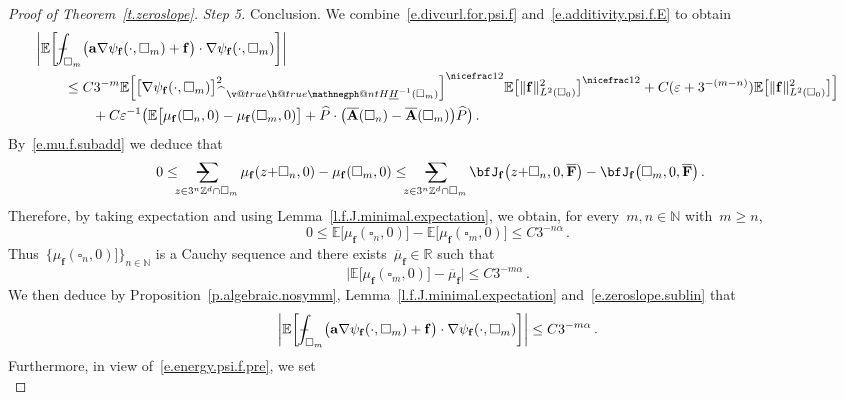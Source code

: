 \documentclass[11pt,twoside]{article} %
\makeatletter
\let\oldsquare\square %
\renewcommand{\square}{\oldsquare}
\numberwithin{equation}{section}
\theoremstyle{definition}
\newcommand*{\N}{\ensuremath{\mathbb{N}}}
\newcommand*{\Z}{\ensuremath{\mathbb{Z}}}
\newcommand*{\R}{\ensuremath{\mathbb{R}}}
\newcommand{\eps}{\varepsilon}
\renewcommand*{\hat}{\widehat}
\newcommand{\f}{\mathbf{f}}
\newcommand{\ep}{\eps}
\renewcommand{\a}{\mathbf{a}}
\newcommand{\cu}{\square}
\newcommand{\E}{\mathbb{E}}
\newcommand{\avsum}{\mathop{\mathpalette\avsuminner\relax}\displaylimits}
\newcommand\avsuminner[2]{%
  {\sbox0{$\m@th#1\sum$}%
   \vphantom{\usebox0}%
   \ooalign{%
     \hidewidth
     \smash{\,\rule[.23em]{8.8pt}{1.1pt} \relax}%
     \hidewidth\cr
   ~$\m@th#1\sum$\cr
   }%
  }%
}
\def\Xint#1{\mathchoice
{\XXint\displaystyle\textstyle{#1}}%
{\XXint\textstyle\scriptstyle{#1}}%
{\XXint\scriptstyle\scriptscriptstyle{#1}}%
{\XXint\scriptscriptstyle\scriptscriptstyle{#1}}%
\!\int}
\def\XXint#1#2#3{{\setbox0=\hbox{$#1{#2#3}{\int}$}
\vcenter{\hbox{$#2#3$}}\kern-.5\wd0}}
\def\fint{\Xint-}
\newcommand{\negphantom}{\v@true\h@true\negph@nt}
\newcommand{\negph@nt}{\ifmmode\expandafter\mathpalette 
  \expandafter\mathnegph@nt\else\expandafter\makenegph@nt\fi}
\newcommand{\makenegph@nt}[1]{%
  \setbox\z@\hbox{\color@begingroup#1\color@endgroup}\finnegph@nt}
\newcommand{\finnegph@nt}{%
  \setbox\tw@\null 
  \ifv@ \ht\tw@\ht\z@\dp\tw@\dp\z@\fi \ifh@\wd\tw@-\wd\z@\fi\box\tw@}
\newcommand{\mathnegph@nt}[2]{%
  \setbox\z@\hbox{$\m@th #1{#2}$}\finnegph@nt}
\newcommand{\Hminusul}{\hat{\phantom{H}}\negphantom{H}\underline{H}^{-1}}
\newcommand{\bfAhom}{\overline{\mathbf{A}}}
\newcommand{\bfF}{\mathbf{F}}
\makeatother
\begin{document}
\begin{proof}[{Proof of Theorem~\ref{t.zeroslope}}]
\smallskip


\emph{Step 5.} Conclusion. We combine~\eqref{e.divcurl.for.psi.f} and~\eqref{e.additivity.psi.f.E} to obtain 
\begin{align*} 
\lefteqn{
\biggl| \E\biggl[ \fint_{\cu_m} \bigl( \a \nabla \psi_{\f} (\cdot,\cu_m) + \f \bigr) \cdot \nabla \psi_{\f}(\cdot,\cu_m) \biggr]\biggr|
} \qquad &
\notag \\ &
\leq
C 
3^{-m} \E\Bigl[ \bigl[ \nabla \psi_{\f}(\cdot,\cu_m)  \bigr]_{\Hminusul(\cu_m)}^2\Bigr]^{\nicefrac12} \E \bigl[ \| \f \|_{L^2(\cu_0)}^2 \bigr]^{\nicefrac12}
+
C (\ep + 3^{-(m-n)}) \E \bigl[ \| \f \|_{L^2(\cu_0)}^2 \bigr]
 \Bigr]
 \notag \\ & \qquad 
+
 C\ep^{-1} \bigl( \E\bigl[ \mu_{\f}(\cu_n,0) - \mu_{\f}(\cu_m,0)  \bigr]
+  \hat{P} \cdot \bigl( \bfAhom(\cu_n) - 
\bfAhom(\cu_m)  \bigr)\hat{P} \bigr)
\,.
\end{align*}
By~\eqref{e.mu.f.subadd} we deduce that
\begin{align*} 
0 
& 
\leq 
\!\!\! \avsum_{z \in 3^n \Z^d \cap \cu_m}  \mu_{\f}(z{+}\cu_n,0)  
- \mu_{\f}(\cu_m,0) 
\leq 
\!\!\! \avsum_{z \in 3^n \Z^d \cap \cu_m}   
\bfJ_{\f}\bigl(z{+}\cu_n,0, \overline{\bfF} \bigr)
-
 \bfJ_{\f}\bigl(\cu_m,0, \overline{\bfF} \bigr)
 \,.
\end{align*}
Therefore, by taking expectation and using Lemma~\ref{l.f.J.minimal.expectation}, we obtain, for every~$m,n\in\N$ with~$m \geq n$, 
\begin{equation*} 
0\leq \E\bigl[ \mu_{\f}(\cu_n,0) \bigr] - \E\bigl[ \mu_{\f}(\cu_m,0) \bigr] \leq C 3^{-n \alpha}
 \,.
\end{equation*}
Thus~$\{\mu_{\f}(\cu_n,0) \bigr]\}_{n \in \N}$ is a Cauchy sequence and there exists~$\overline{\mu}_{\f} \in \R$ such that
\begin{equation*} 
\bigl| \E\bigl[ \mu_{\f}(\cu_m,0) \bigr]  - \overline{\mu}_{\f} \bigr| \leq   C 3^{-m \alpha}
 \,.
\end{equation*} 
We then deduce by Proposition~\ref{p.algebraic.nosymm}, Lemma~\ref{l.f.J.minimal.expectation} and~\eqref{e.zeroslope.sublin} that 
\begin{equation*} 
\biggl| \E\biggl[ \fint_{\cu_m} \bigl( \a \nabla \psi_{\f} (\cdot,\cu_m) + \f \bigr) \cdot \nabla \psi_{\f}(\cdot,\cu_m) \biggr]\biggr|
\leq   C 3^{-m \alpha}
\,.
\end{equation*}
Furthermore, in view of~\eqref{e.energy.psi.f.pre}, we set
\begin{equation*} 

\end{equation*}
\end{proof}
\end{document}
